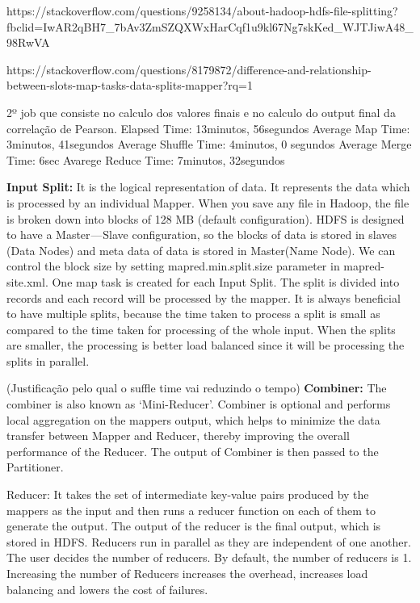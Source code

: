 https://stackoverflow.com/questions/9258134/about-hadoop-hdfs-file-splitting?fbclid=IwAR2qBH7_7bAv3ZmSZQXWxHarCqf1u9kl67Ng7skKed_WJTJiwA48_98RwVA

https://stackoverflow.com/questions/8179872/difference-and-relationship-between-slots-map-tasks-data-splits-mapper?rq=1

2º job que consiste no calculo dos valores finais e no calculo do output final da correlação de Pearson.
Elapsed Time: 13minutos, 56segundos
Average Map Time: 3minutos, 41segundos
Average Shuffle Time: 4minutos, 0 segundos
Average Merge Time: 6sec
Avarege Reduce Time: 7minutos, 32segundos

\textbf{Input Split:} It is the logical representation of data. It represents the data which is processed by an individual Mapper. When you save any file in Hadoop, the file is broken down into blocks of 128 MB (default configuration). HDFS is designed to have a Master — Slave configuration, so the blocks of data is stored in slaves (Data Nodes) and meta data of data is stored in Master(Name Node). We can control the block size by setting mapred.min.split.size parameter in mapred-site.xml. One map task is created for each Input Split. The split is divided into records and each record will be processed by the mapper.
 It is always beneficial to have multiple splits, because the time taken to process a split is small as compared to the time taken for processing of the whole input. When the splits are smaller, the processing is better load balanced since it will be processing the splits in parallel.
 
 (Justificação pelo qual o suffle time vai reduzindo o tempo) \textbf{Combiner:} The combiner is also known as ‘Mini-Reducer’. Combiner is optional and performs local aggregation on the mappers output, which helps to minimize the data transfer between Mapper and Reducer, thereby improving the overall performance of the Reducer. The output of Combiner is then passed to the Partitioner.
 
 Reducer: It takes the set of intermediate key-value pairs produced by the mappers as the input and then runs a reducer function on each of them to generate the output. The output of the reducer is the final output, which is stored in HDFS. Reducers run in parallel as they are independent of one another. The user decides the number of reducers. By default, the number of reducers is 1. Increasing the number of Reducers increases the overhead, increases load balancing and lowers the cost of failures.

